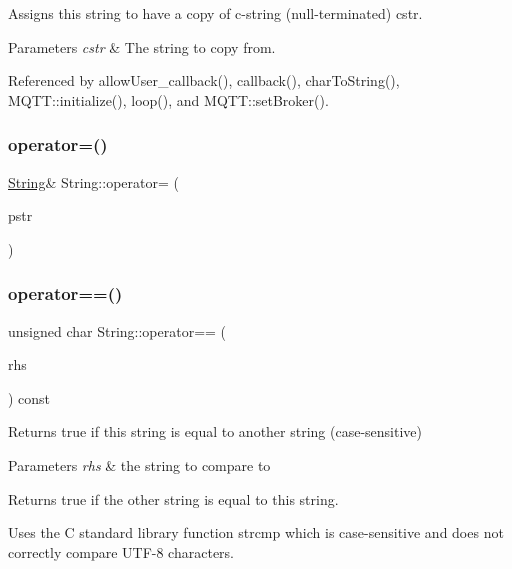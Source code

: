 Assigns this string to have a copy of c-\/string (null-\/terminated) cstr. 


\begin{DoxyParams}{Parameters}
{\em cstr} & The string to copy from. \\
\hline
\end{DoxyParams}


Referenced by allow\+User\+\_\+callback(), callback(), char\+To\+String(), M\+Q\+T\+T\+::initialize(), loop(), and M\+Q\+T\+T\+::set\+Broker().

\mbox{\label{class_string_a965951ee729f850adb40d3c0997922bb}} 
\subsubsection{\texorpdfstring{operator=()}{operator=()}\hspace{0.1cm}{\footnotesize\ttfamily [3/3]}}
{\footnotesize\ttfamily \hyperlink{class_string}{String}\& String\+::operator= (\begin{DoxyParamCaption}\item[{const \+\_\+\+\_\+\+Flash\+String\+Helper $\ast$}]{pstr }\end{DoxyParamCaption})}

\mbox{\label{class_string_a21388f8d52ccecd225db7d6724d3e38f}} 
\subsubsection{\texorpdfstring{operator==()}{operator==()}\hspace{0.1cm}{\footnotesize\ttfamily [1/2]}}
{\footnotesize\ttfamily unsigned char String\+::operator== (\begin{DoxyParamCaption}\item[{const \hyperlink{class_string}{String} \&}]{rhs }\end{DoxyParamCaption}) const\hspace{0.3cm}{\ttfamily [inline]}}



Returns true if this string is equal to another string (case-\/sensitive) 


\begin{DoxyParams}{Parameters}
{\em rhs} & the string to compare to\\
\hline
\end{DoxyParams}
\begin{DoxyReturn}{Returns}
true if the other string is equal to this string.
\end{DoxyReturn}
Uses the C standard library function strcmp which is case-\/sensitive and does not correctly compare U\+T\+F-\/8 characters. 

